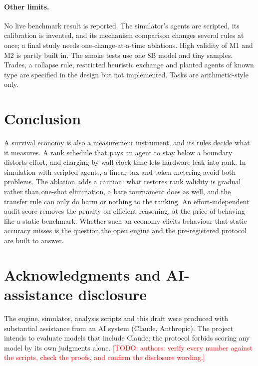 \documentclass[11pt]{article}
\theoremstyle{plain}
\theoremstyle{remark}
\newcommand{\todo}[1]{\textcolor{red}{[TODO: #1]}}
\begin{document}
\paragraph{Other limits.}
No live benchmark result is reported. The simulator's agents are scripted, its calibration is invented, and its mechanism comparison changes several rules at once; a final study needs one-change-at-a-time ablations. High validity of M1 and M2 is partly built in. The smoke tests use one 8B model and tiny samples. Trades, a collapse rule, restricted heuristic exchange and planted agents of known type are specified in the design but not implemented. Tasks are arithmetic-style only.

\section{Conclusion}
A survival economy is also a measurement instrument, and its rules decide what it measures. A rank schedule that pays an agent to stay below a boundary distorts effort, and charging by wall-clock time lets hardware leak into rank. In simulation with scripted agents, a linear tax and token metering avoid both problems. The ablation adds a caution: what restores rank validity is gradual rather than one-shot elimination, a bare tournament does as well, and the transfer rule can only do harm or nothing to the ranking. An effort-independent audit score removes the penalty on efficient reasoning, at the price of behaving like a static benchmark. Whether such an economy elicits behaviour that static accuracy misses is the question the open engine and the pre-registered protocol are built to answer.

\section*{Acknowledgments and AI-assistance disclosure}
The engine, simulator, analysis scripts and this draft were produced with substantial assistance from an AI system (Claude, Anthropic). The project intends to evaluate models that include Claude; the protocol forbids scoring any model by its own judgments alone. \todo{authors: verify every number against the scripts, check the proofs, and confirm the disclosure wording.}




\appendix
\end{document}
